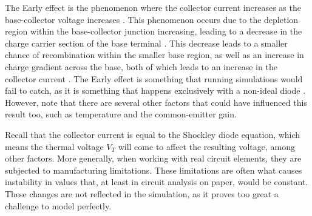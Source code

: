 \documentclass[11pt]{report}
\begin{document}
The Early effect is the phenomenon where the collector current increases as the base-collector voltage increases \autocite{EarlyEffect2024,54NonidealEffects}. This phenomenon occurs due to the depletion region within the base-collector junction increasing, leading to a decrease in the charge carrier section of the base terminal \autocite{EarlyEffect2024}. This decrease leads to a smaller chance of recombination within the smaller base region, as well as an increase in charge gradient across the base, both of which leads to an increase in the collector current \autocite{EarlyEffect2024}. The Early effect is something that running simulations would fail to catch, as it is something that happens exclusively with a non-ideal diode \autocite{54NonidealEffects}. However, note that there are several other factors that could have influenced this result too, such as temperature and the common-emitter gain.

Recall that the collector current is equal to the Shockley diode equation, which means the thermal voltage $V_T$ will come to affect the resulting voltage, among other factors. More generally, when working with real circuit elements, they are subjected to manufacturing limitations. These limitations are often what causes instability in values that, at least in circuit analysis on paper, would be constant. These changes are not reflected in the simulation, as it proves too great a challenge to model perfectly.
\end{document}

